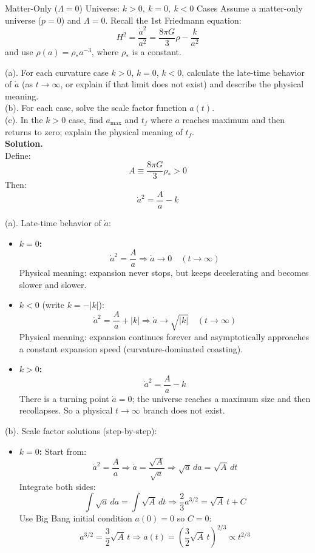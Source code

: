 \clearpage
\begin{example}{Matter-Only ($\Lambda=0$) Universe: $k>0,\ k=0,\ k<0$ Cases}{}
    Assume a matter-only universe ($p=0$) and $\Lambda=0$. Recall the 1st Friedmann equation:
    \[
        H^2 = \frac{\dot{a}^2}{a^2} = \frac{8\pi G}{3}\rho - \frac{k}{a^2}
    \]
    and use $\rho(a)=\rho_* a^{-3}$, where $\rho_*$ is a constant.

    (a). For each curvature case $k>0$, $k=0$, $k<0$, calculate the late-time behavior of $\dot{a}$ (as $t\to\infty$, or explain if that limit does not exist) and describe the physical meaning. \\
    (b). For each case, solve the scale factor function $a(t)$. \\
    (c). In the $k>0$ case, find $a_{\max}$ and $t_f$ where $a$ reaches maximum and then returns to zero; explain the physical meaning of $t_f$. \\

    \bigskip\textbf{Solution.}\quad \\
    Define:
    \[
        A \equiv \frac{8\pi G}{3}\rho_* > 0
    \]
    Then:
    \[
        \dot{a}^2 = \frac{A}{a} - k
    \]

    (a). Late-time behavior of $\dot{a}$:
    \begin{itemize}
        \item \textbf{$k=0$:}
        \[
            \dot{a}^2 = \frac{A}{a} \Rightarrow \dot{a} \to 0 \quad (t\to\infty)
        \]
        Physical meaning: expansion never stops, but keeps decelerating and becomes slower and slower.

        \item \textbf{$k<0$} (write $k=-|k|$):
        \[
            \dot{a}^2 = \frac{A}{a} + |k| \Rightarrow \dot{a} \to \sqrt{|k|} \quad (t\to\infty)
        \]
        Physical meaning: expansion continues forever and asymptotically approaches a constant expansion speed (curvature-dominated coasting).

        \item \textbf{$k>0$:}
        \[
            \dot{a}^2 = \frac{A}{a} - k
        \]
        There is a turning point $\dot{a}=0$; the universe reaches a maximum size and then recollapses. So a physical $t\to\infty$ branch does not exist.
    \end{itemize}

    (b). Scale factor solutions (step-by-step):
    \begin{itemize}
        \item \textbf{$k=0$:}
        Start from:
        \[
            \dot{a}^2 = \frac{A}{a}
            \Rightarrow
            \dot{a} = \frac{\sqrt{A}}{\sqrt{a}}
            \Rightarrow
            \sqrt{a}\,da = \sqrt{A}\,dt
        \]
        Integrate both sides:
        \[
            \int \sqrt{a}\,da = \int \sqrt{A}\,dt
            \Rightarrow
            \frac{2}{3}a^{3/2} = \sqrt{A}\,t + C
        \]
        Use Big Bang initial condition $a(0)=0$ so $C=0$:
        \[
            a^{3/2} = \frac{3}{2}\sqrt{A}\,t
            \Rightarrow
            a(t) = \left(\frac{3}{2}\sqrt{A}\,t\right)^{2/3} \propto t^{2/3}
        \]


\end{itemize}
\end{example}
